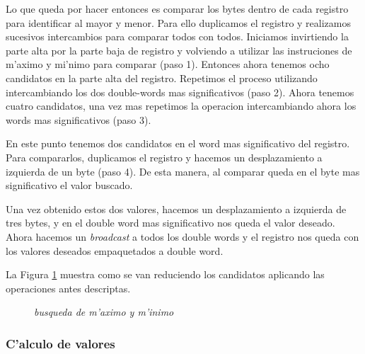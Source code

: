 Lo que queda por hacer entonces es comparar los bytes dentro de cada registro para identificar al mayor y menor. Para ello duplicamos el registro y realizamos sucesivos intercambios para comparar todos con todos. Iniciamos invirtiendo la parte alta por la parte baja de registro y volviendo a utilizar las instruciones de m'aximo y mi'nimo para comparar (paso 1). Entonces ahora tenemos ocho candidatos en la parte alta del registro. Repetimos el proceso utilizando intercambiando los dos double-words mas significativos (paso 2). Ahora tenemos cuatro candidatos, una vez mas repetimos la operacion intercambiando ahora los words mas significativos (paso 3).

En este punto tenemos dos candidatos en el word mas significativo del registro. Para compararlos, duplicamos el registro y hacemos un desplazamiento a izquierda de un byte (paso 4). De esta manera, al comparar queda en el byte mas significativo el valor buscado. 

Una vez obtenido estos dos valores, hacemos un desplazamiento a izquierda de tres bytes, y en el double word mas significativo nos queda el valor deseado. Ahora hacemos un \textit{broadcast} a todos los double words y el registro nos queda con los valores deseados empaquetados a double word.

La Figura \ref{est:normalizar-1} muestra como se van reduciendo los candidatos aplicando las operaciones antes descriptas.

\begin{figure}[ht]
\caption{\textit{busqueda de m'aximo y m'inimo}}
\label{est:normalizar-1}
\end{figure}


\subsubsection*{C'alculo de valores}